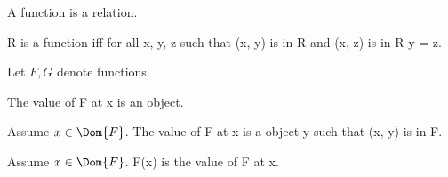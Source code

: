 \documentclass{article}
\begin{document}
\begin{forthel}
    \begin{signature}
      A function is a relation.
    \end{signature}

    \begin{axiom}[FunctionIntro]
      R is a function iff for all x, y, z such that (x, y) is in R and (x, z) is in R y = z.
    \end{axiom}

    Let $F, G$ denote functions.

    \begin{signature}
      The value of F at x is an object.
    \end{signature}

    \begin{axiom}
      Assume $x \in \Dom{F}$.
      The value of F at x is a object y such that (x, y) is in F.
    \end{axiom}

    \begin{definition}
      Assume $x \in \Dom{F}$.
      F(x) is the value of F at x.
    \end{definition}
  \end{forthel}
\end{document}
